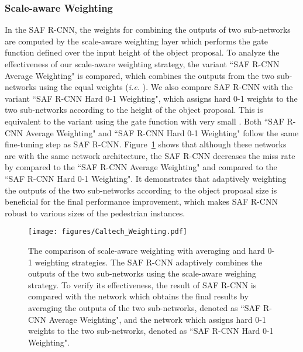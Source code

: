 \documentclass[journal]{IEEEtran}
\begin{document}
\subsubsection{Scale-aware Weighting}
In the SAF R-CNN, the weights for combining the outputs of two sub-networks are computed by the scale-aware weighting layer which performs the gate function defined over the input height of the object proposal. To analyze the effectiveness of our scale-aware weighting strategy, the variant ``SAF R-CNN Average Weighting" is compared, which combines the outputs from the two sub-networks using the equal weights (\emph{i.e.} ). We also compare SAF R-CNN with the variant ``SAF R-CNN Hard 0-1 Weighting", which assigns hard 0-1 weights to the two sub-networks according to the height of the object proposal. This is equivalent to the variant using the gate function with very small . Both ``SAF R-CNN Average Weighting" and ``SAF R-CNN Hard 0-1 Weighting" follow the same fine-tuning step as SAF R-CNN. Figure~\ref{fig:Caltech_Weighting} shows that although these networks are with the same network architecture, the SAF R-CNN decreases the miss rate by  compared to the ``SAF R-CNN Average Weighting" and  compared to the ``SAF R-CNN Hard 0-1 Weighting". It demonstrates that adaptively weighting the outputs of the two sub-networks according to the object proposal size is beneficial for the final performance improvement, which makes SAF R-CNN robust to various sizes of the pedestrian instances.



\begin{figure}
	\begin{center}
		\texttt{[image: figures/Caltech\_Weighting.pdf]}
		\caption{{The comparison of scale-aware weighting with averaging and hard 0-1 weighting strategies. The SAF R-CNN adaptively combines the outputs of the two sub-networks using the scale-aware weighing strategy. To verify its effectiveness, the result of SAF R-CNN is compared with the network which obtains the final results by averaging the outputs of the two sub-networks, denoted as ``SAF R-CNN Average Weighting", and the network which assigns hard 0-1 weights to the two sub-networks, denoted as ``SAF R-CNN Hard 0-1 Weighting".}}	
		\label{fig:Caltech_Weighting}
	\end{center}
	\vspace{-4mm}
\end{figure}
\end{document}

